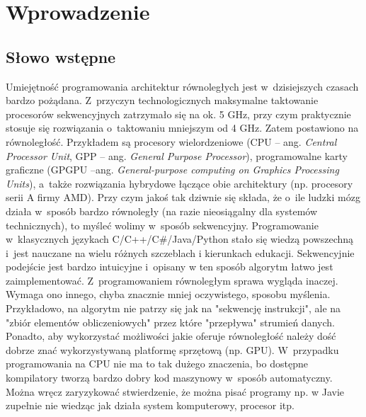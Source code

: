 \chapter{Wprowadzenie}
\label{cha:introduction}



\section{Słowo wstępne}

Umiejętność programowania architektur równoległych jest w~dzisiejszych czasach bardzo pożądana. 
Z~przyczyn technologicznych maksymalne taktowanie procesorów sekwencyjnych zatrzymało się na ok. 5 GHz, przy czym praktycznie stosuje się rozwiązania o~taktowaniu mniejszym od 4 GHz.
Zatem postawiono na równoległość. 
Przykładem są procesory wielordzeniowe (CPU -- ang. \textit{Central Processor Unit}, GPP -- ang. \textit{General Purpose Processor}), programowalne karty graficzne (GPGPU --ang. \textit{General-purpose computing on Graphics Processing Units}), a~także rozwiązania hybrydowe łączące obie architektury (np. procesory serii A firmy AMD).
Przy czym jakoś tak dziwnie się składa, że o~ile ludzki mózg działa w~sposób bardzo równoległy (na razie nieosiągalny dla systemów technicznych), to myśleć wolimy w~sposób sekwencyjny.
Programowanie w~klasycznych językach C/C++/C\#/Java/Python stało się wiedzą powszechną i~jest nauczane na wielu różnych szczeblach i kierunkach edukacji. 
Sekwencyjnie podejście jest bardzo intuicyjne i~opisany w ten sposób algorytm łatwo jest zaimplementować.
Z~programowaniem równoległym sprawa wygląda inaczej. 
Wymaga ono innego, chyba znacznie mniej oczywistego, sposobu myślenia.
Przykładowo, na algorytm nie patrzy się jak na "sekwencję instrukcji", ale na "zbiór elementów obliczeniowych" przez które "przepływa" strumień danych.
Ponadto, aby  wykorzystać możliwości jakie oferuje równoległość należy dość dobrze znać wykorzystywaną platformę sprzętową (np. GPU).
W~przypadku programowania na CPU nie ma to tak dużego znaczenia, bo dostępne kompilatory tworzą bardzo dobry kod maszynowy w~sposób automatyczny.
Można wręcz zaryzykować stwierdzenie, że można pisać programy np. w Javie zupełnie nie wiedząc jak działa system komputerowy, procesor itp.


